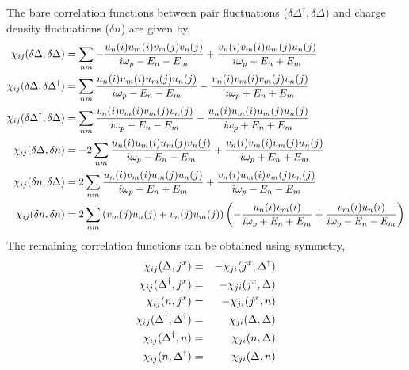 \documentclass[Colective.tex]{revtex4-1}
\begin{document}
The bare correlation functions between pair fluctuations ($\delta\Delta^\dagger,\delta\Delta$) and charge density fluctuations ($\delta n$) are given by,
\begin{align}
\chi_{ij}(\delta\Delta,\delta\Delta) &= \sum_{nm} -{u_n(i)u_m(i) v_m(j)v_n(j) \over i\omega_p-E_n-E_m}
+ {v_n(i)v_m(i) u_m(j)u_n(j) \over i\omega_p+E_n+E_m} \\
\chi_{ij}(\delta\Delta,\delta\Delta^\dagger) &= \sum_{nm} {u_n(i)u_m(i) u_m(j)u_n(j) \over i\omega_p-E_n-E_m}
- {v_n(i)v_m(i) v_m(j)v_n(j) \over i\omega_p+E_n+E_m} \\
\chi_{ij}(\delta\Delta^\dagger,\delta\Delta) &= \sum_{nm} {v_n(i)v_m(i) v_m(j)v_n(j) \over i\omega_p-E_n-E_m}
- {u_n(i)u_m(i) u_m(j)u_n(j) \over i\omega_p+E_n+E_m}\\
\chi_{ij}(\delta\Delta,\delta n) &= -2 \sum_{nm}  {u_n(i)u_m(i)u_{m}(j)v_{n}(j) \over i\omega_p-E_n-E_m}
+ {v_n(i)v_m(i) v_{m}(j)u_{n}(j) \over i\omega_p+E_n+E_m} \\
\chi_{ij}(\delta n,\delta \Delta) &= 2\sum_{nm} {u_n(i)v_m(i) u_{m}(j)u_{n}(j) \over i\omega_p+E_n+E_m}
+ {v_n(i)u_m(i) v_{m}(j)v_{n}(j) \over i\omega_p-E_n-E_m} \\
\chi_{ij}(\delta n,\delta n) &= 2\sum_{nm} 
{ \left(v_{m}(j)u_{n}(j) + v_{n}(j)u_{m}(j)\right)} \left( -{u_n(i)v_m(i)\over i\omega_p+E_n+E_m} +  {v_m(i)u_n(i)\over i\omega_p-E_n-E_m} \right)
\end{align}
\indent  The remaining correlation functions can be obtained using symmetry,
\begin{eqnarray}
\chi_{ij}(\Delta,j^x) &= &-\chi_{ji}(j^x,\Delta^\dagger) \nonumber\\
\chi_{ij}(\Delta^\dagger,j^x) &= &-\chi_{ji}(j^x,\Delta) \nonumber\\
\chi_{ij}(n,j^x) &= &-\chi_{ji}(j^x,n) \\
\chi_{ij}(\Delta^\dagger,\Delta^\dagger) &= &\chi_{ji}(\Delta,\Delta) \nonumber\\
\chi_{ij}(\Delta^\dagger,n) &= &\chi_{ji}(n,\Delta) \nonumber\\
\chi_{ij}(n,\Delta^\dagger) &= &\chi_{ji}(\Delta,n) \nonumber
\label{eq.G1}
\end{eqnarray}
\end{document}
